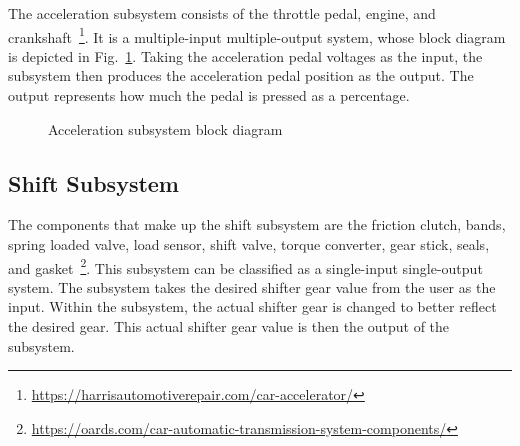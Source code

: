\documentclass[conference]{IEEEtran}
\begin{document}
  The acceleration subsystem consists of the throttle pedal, engine, and crankshaft~\footnote{\url{https://harrisautomotiverepair.com/car-accelerator/}}. It is a multiple-input multiple-output system, whose block diagram is depicted in Fig.~\ref{fig:accelModelArchitecture}.
Taking the acceleration pedal voltages as the input, the subsystem then produces the acceleration pedal position as the output. The output represents how much the pedal is pressed as a percentage. %
%
 \begin{figure}[htbp]
    \centering
    \caption{Acceleration subsystem block diagram}
    \label{fig:accelModelArchitecture}
 \end{figure}
  \subsection{Shift Subsystem}
  The components that make up the shift subsystem are the friction clutch, bands, spring loaded valve, load sensor, shift valve, torque converter, gear stick, seals, and gasket~\footnote{\url{https://oards.com/car-automatic-transmission-system-components/}}. This subsystem can be classified as a single-input single-output system. %
%
  The subsystem takes the desired shifter gear value from the user as the input. Within the subsystem, the actual shifter gear is changed to better reflect the desired gear. This actual shifter gear value is then the output of the subsystem.
\end{document}
